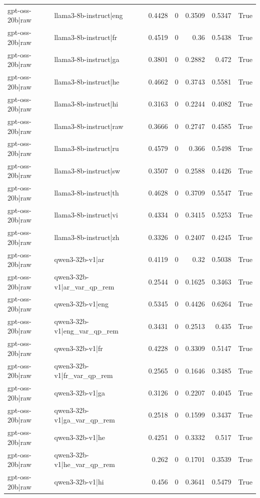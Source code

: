 \begin{table}
\begin{tabular}{l l r r r r l}
gpt-oss-20b|raw & llama3-8b-instruct|eng & 0.4428 & 0 & 0.3509 & 0.5347 & True \\
gpt-oss-20b|raw & llama3-8b-instruct|fr & 0.4519 & 0 & 0.36 & 0.5438 & True \\
gpt-oss-20b|raw & llama3-8b-instruct|ga & 0.3801 & 0 & 0.2882 & 0.472 & True \\
gpt-oss-20b|raw & llama3-8b-instruct|he & 0.4662 & 0 & 0.3743 & 0.5581 & True \\
gpt-oss-20b|raw & llama3-8b-instruct|hi & 0.3163 & 0 & 0.2244 & 0.4082 & True \\
gpt-oss-20b|raw & llama3-8b-instruct|raw & 0.3666 & 0 & 0.2747 & 0.4585 & True \\
gpt-oss-20b|raw & llama3-8b-instruct|ru & 0.4579 & 0 & 0.366 & 0.5498 & True \\
gpt-oss-20b|raw & llama3-8b-instruct|sw & 0.3507 & 0 & 0.2588 & 0.4426 & True \\
gpt-oss-20b|raw & llama3-8b-instruct|th & 0.4628 & 0 & 0.3709 & 0.5547 & True \\
gpt-oss-20b|raw & llama3-8b-instruct|vi & 0.4334 & 0 & 0.3415 & 0.5253 & True \\
gpt-oss-20b|raw & llama3-8b-instruct|zh & 0.3326 & 0 & 0.2407 & 0.4245 & True \\
gpt-oss-20b|raw & qwen3-32b-v1|ar & 0.4119 & 0 & 0.32 & 0.5038 & True \\
gpt-oss-20b|raw & qwen3-32b-v1|ar_var_qp_rem & 0.2544 & 0 & 0.1625 & 0.3463 & True \\
gpt-oss-20b|raw & qwen3-32b-v1|eng & 0.5345 & 0 & 0.4426 & 0.6264 & True \\
gpt-oss-20b|raw & qwen3-32b-v1|eng_var_qp_rem & 0.3431 & 0 & 0.2513 & 0.435 & True \\
gpt-oss-20b|raw & qwen3-32b-v1|fr & 0.4228 & 0 & 0.3309 & 0.5147 & True \\
gpt-oss-20b|raw & qwen3-32b-v1|fr_var_qp_rem & 0.2565 & 0 & 0.1646 & 0.3485 & True \\
gpt-oss-20b|raw & qwen3-32b-v1|ga & 0.3126 & 0 & 0.2207 & 0.4045 & True \\
gpt-oss-20b|raw & qwen3-32b-v1|ga_var_qp_rem & 0.2518 & 0 & 0.1599 & 0.3437 & True \\
gpt-oss-20b|raw & qwen3-32b-v1|he & 0.4251 & 0 & 0.3332 & 0.517 & True \\
gpt-oss-20b|raw & qwen3-32b-v1|he_var_qp_rem & 0.262 & 0 & 0.1701 & 0.3539 & True \\
gpt-oss-20b|raw & qwen3-32b-v1|hi & 0.456 & 0 & 0.3641 & 0.5479 & True \\

\end{tabular}
\end{table}

